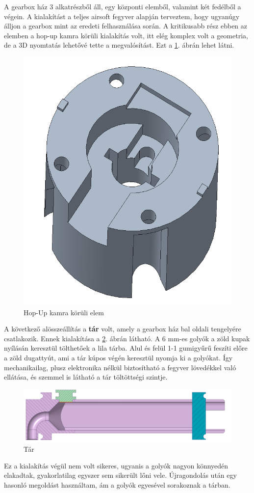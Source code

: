\documentclass[12pt,a4paper]{article}
\begin{document}
A gearbox ház 3 alkatrészből áll, egy központi elemből, valamint két fedélből a végein. A kialakítást a teljes airsoft fegyver alapján terveztem, hogy ugyanúgy álljon a gearbox mint az eredeti felhasználása során. A kritikusabb rész ebben az elemben a hop-up kamra körüli kialakítás volt, itt elég komplex volt a geometria, de a 3D nyomtatás lehetővé tette a megvalósítást. Ezt a \ref{fig:mech_dt4200}. ábrán lehet látni.


\begin{figure}[h!]
	\centering
	\includegraphics[width=0.4\linewidth]{mech_dt4200}
	\caption{Hop-Up kamra körüli elem}
	\label{fig:mech_dt4200}
\end{figure}


A következő alösszeállítás a \textbf{tár} volt, amely a gearbox ház bal oldali tengelyére csatlakozik. Ennek kialakítása a \ref{fig:mech_tar}. ábrán látható. A 6 mm-es golyók a zöld kupak nyílásán keresztül tölthetőek a lila tárba. Alul és felül 1-1 gumigyűrű feszíti előre a zöld dugattyút, ami a tár kúpos végén keresztül nyomja ki a golyókat. Így mechanikailag, plusz elektronika nélkül biztosítható a fegyver lövedékkel való ellátása, és szemmel is látható a tár töltöttségi szintje.

\begin{figure}[h!]
	\centering
	\includegraphics[width=1\linewidth]{mech_tar}
	\caption{Tár}
	\label{fig:mech_tar}
\end{figure}

Ez a kialakítás végül nem volt sikeres, ugyanis a golyók nagyon könnyedén elakadtak, gyakorlatilag egyszer sem sikerült lőni vele. Újragondolás után egy hasonló megoldást használtam, ám a golyók egyesével sorakoznak a tárban.
\end{document}
